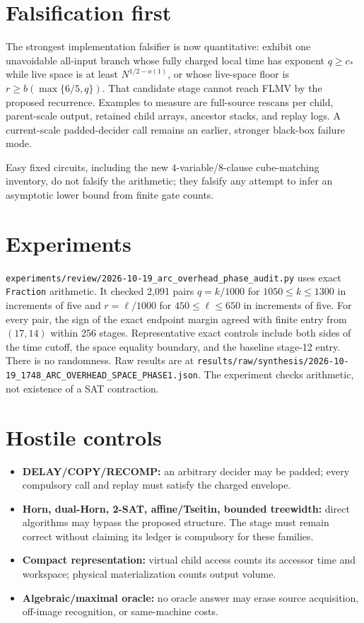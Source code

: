 \documentclass[11pt]{article}
\begin{document}
\section*{Falsification first}
The strongest implementation falsifier is now quantitative: exhibit one
unavoidable all-input branch whose fully charged local time has exponent
$q\ge c_*$ while live space is at least $N^{1/2-o(1)}$, or whose live-space
floor is $r\ge b(\max\{6/5,q\})$.  That candidate stage cannot reach FLMV by
the proposed recurrence.  Examples to measure are full-source rescans per
child, parent-scale output, retained child arrays, ancestor stacks, and replay
logs.  A current-scale padded-decider call remains an earlier, stronger
black-box failure mode.

Easy fixed circuits, including the new $4$-variable/$8$-clause cube-matching
inventory, do not falsify the arithmetic; they falsify any attempt to infer an
asymptotic lower bound from finite gate counts.

\section*{Experiments}
\texttt{experiments/review/2026-10-19\_arc\_overhead\_phase\_audit.py}
uses exact \texttt{Fraction} arithmetic.  It checked 2,091 pairs
$q=k/1000$ for $1050\le k\le1300$ in increments of five and
$r=\ell/1000$ for $450\le\ell\le650$ in increments of five.  For every pair,
the sign of the exact endpoint margin agreed with finite entry from $(17,14)$
within 256 stages.  Representative exact controls include both sides of the
time cutoff, the space equality boundary, and the baseline stage-12 entry.
There is no randomness.  Raw results are at
\texttt{results/raw/synthesis/2026-10-19\_1748\_ARC\_OVERHEAD\_SPACE\_PHASE1.json}.
The experiment checks arithmetic, not existence of a SAT contraction.

\section*{Hostile controls}
\begin{itemize}[leftmargin=*]
  \item \textbf{DELAY/COPY/RECOMP:} an arbitrary decider may be padded; every
  compulsory call and replay must satisfy the charged envelope.
  \item \textbf{Horn, dual-Horn, 2-SAT, affine/Tseitin, bounded treewidth:}
  direct algorithms may bypass the proposed structure.  The stage must remain
  correct without claiming its ledger is compulsory for these families.
  \item \textbf{Compact representation:} virtual child access counts its
  accessor time and workspace; physical materialization counts output volume.
  \item \textbf{Algebraic/maximal oracle:} no oracle answer may erase source
  acquisition, off-image recognition, or same-machine costs.
\end{itemize}
\end{document}
